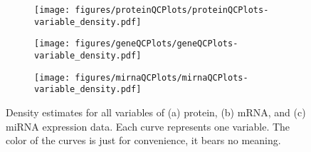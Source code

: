 \begin{figure}[!h]
	\centering
	\begin{subfigure}{.32\textwidth}
		\centering
		\texttt{[image: figures/proteinQCPlots/proteinQCPlots-variable\_density.pdf]}
		\subcaption{\label{fig:protein-variable-density}}
	\end{subfigure}
	\begin{subfigure}{.32\textwidth}
		\centering
		\texttt{[image: figures/geneQCPlots/geneQCPlots-variable\_density.pdf]}
		\subcaption{\label{fig:mrna-variable-density}}
	\end{subfigure}
	\begin{subfigure}{.32\textwidth}
		\centering
		\texttt{[image: figures/mirnaQCPlots/mirnaQCPlots-variable\_density.pdf]}
		\subcaption{\label{fig:mirna-variable-density}}
	\end{subfigure}%
	\caption{Density estimates for all variables of (a) protein, (b) mRNA, and (c) miRNA expression data.
	Each curve represents one variable. The color of the curves is just for convenience, it bears
	no meaning.}
	\label{fig:qc-density}
\end{figure}
